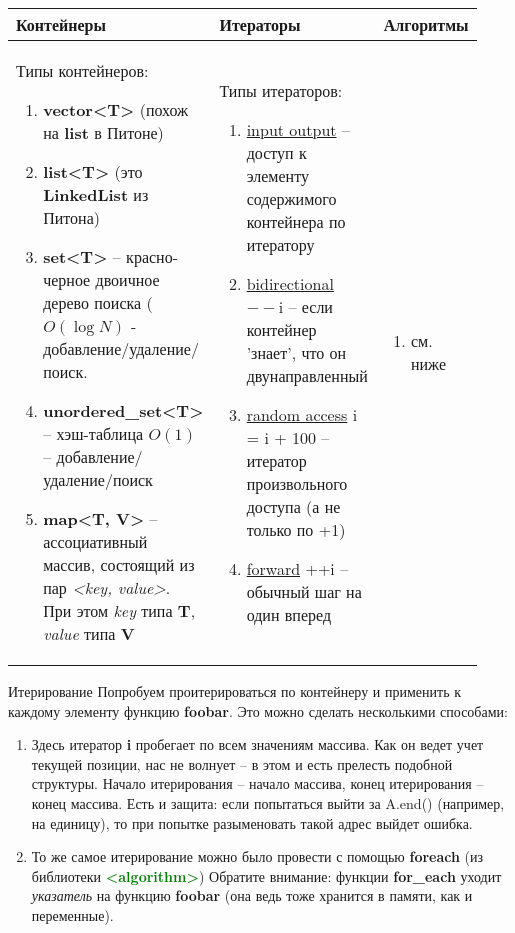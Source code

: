 \begin{lecture}[\lectureSubject]
\begin{lecSection}
\begin{tabular}{|p{0.31\linewidth}|p{0.31\linewidth}|p{0.31\linewidth}|}
			\hline Контейнеры	& Итераторы	& Алгоритмы \\	\hline
					Типы контейнеров: 
					\begin{enumerate}
						\item \textbf{vector<T>} (похож на \textbf{list} в Питоне)	
						\item \textbf{list<T>} (это \textbf{LinkedList} из Питона)
						\item 	\textbf{set<T>} -- красно-черное двоичное дерево поиска ($O(\log{N})$ - добавление/удаление/поиск.
						\item \textbf{unordered\_set<T>} -- хэш-таблица $O(1)$ -- добавление/удаление/поиск
						\item \textbf{map<T, V>} -- ассоциативный массив, состоящий из пар \textit{<key, value>}. При этом \textit{key} типа \textbf{T}, \textit{value} типа \textbf{V}
					\end{enumerate} &
					Типы итераторов:
					\begin{enumerate}
						\item \underline{input output} -- доступ к элементу содержимого контейнера по итератору
						\item \underline{bidirectional} $--$i -- если контейнер 'знает', что он двунаправленный
						\item \underline{random access} i = i + 100 -- итератор произвольного доступа (а не только по +1) 
						\item \underline{forward} ++i -- обычный шаг на один вперед
					\end{enumerate}  & \begin{enumerate}
					\item см. ниже 
				\end{enumerate} \\ \hline
		\end{tabular}
		\begin{lecSubsection}{Итерирование}
		Попробуем проитерироваться по контейнеру и применить к каждому элементу функцию \textbf{foobar}. Это можно сделать несколькими способами:
		\begin{enumerate}
			\item 		{}
			Здесь итератор \textbf{i} пробегает по всем значениям массива. Как он ведет учет текущей позиции, нас не волнует -- в этом и есть прелесть подобной структуры. Начало итерирования -- начало массива, конец итерирования -- конец массива. Есть и защита: если попытаться выйти за A.end() (например, на единицу), то при попытке разыменовать такой адрес выйдет ошибка. 
			\item 		То же самое итерирование можно было провести с помощью \textbf{foreach} (из библиотеки \textcolor{green}{\textbf{<algorithm>}})
			Обратите внимание: функции \textbf{for\_each} уходит \textit{указатель} на функцию \textbf{foobar} (она ведь тоже хранится в памяти, как и переменные).
		\end{enumerate}


\end{lecSubsection}
\end{lecSection}
\end{lecture}
